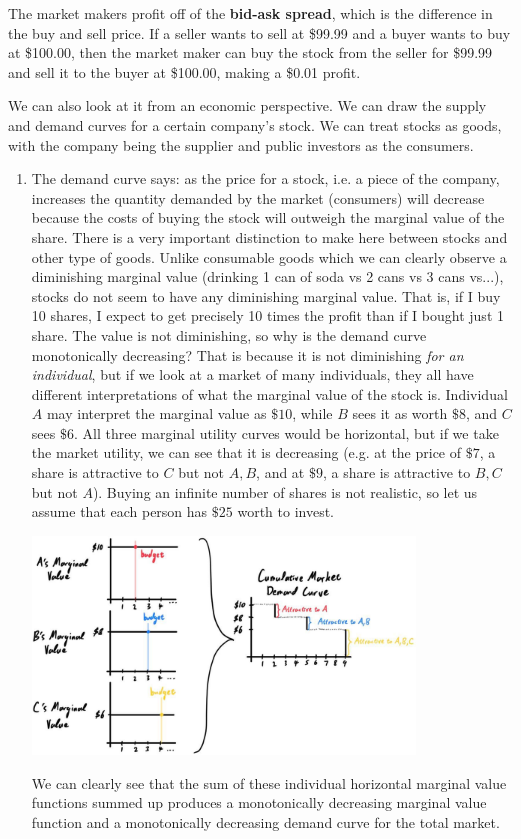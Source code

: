 \documentclass{article}
\begin{document}
    The market makers profit off of the \textbf{bid-ask spread}, which is the difference in the buy and sell price. If a seller wants to sell at \$99.99 and a buyer wants to buy at \$100.00, then the market maker can buy the stock from the seller for \$99.99 and sell it to the buyer at \$100.00, making a \$0.01 profit. 

    We can also look at it from an economic perspective. We can draw the supply and demand curves for a certain company's stock. We can treat stocks as goods, with the company being the supplier and public investors as the consumers. 
    \begin{enumerate}
      \item The demand curve says: as the price for a stock, i.e. a piece of the company, increases the quantity demanded by the market (consumers) will decrease because the costs of buying the stock will outweigh the marginal value of the share. There is a very important distinction to make here between stocks and other type of goods. Unlike consumable goods which we can clearly observe a diminishing marginal value (drinking 1 can of soda vs 2 cans vs 3 cans vs...), stocks do not seem to have any diminishing marginal value. That is, if I buy 10 shares, I expect to get precisely 10 times the profit than if I bought just 1 share. The value is not diminishing, so why is the demand curve monotonically decreasing? That is because it is not diminishing \textit{for an individual}, but if we look at a market of many individuals, they all have different interpretations of what the marginal value of the stock is. Individual $A$ may interpret the marginal value as $\$10$, while $B$ sees it as worth $\$8$, and $C$ sees $\$6$. All three marginal utility curves would be horizontal, but if we take the market utility, we can see that it is decreasing (e.g. at the price of $\$7$, a share is attractive to $C$ but not $A, B$, and at $\$9$, a share is attractive to $B, C$ but not $A$). Buying an infinite number of shares is not realistic, so let us assume that each person has $\$25$ worth to invest. 
      \begin{center}
        \includegraphics[width=0.8\textwidth]{img/Stock_demand_curve.jpg}
      \end{center}
      We can clearly see that the sum of these individual horizontal marginal value functions summed up produces a monotonically decreasing marginal value function and a monotonically decreasing demand curve for the total market. 


\end{enumerate}
\end{document}
